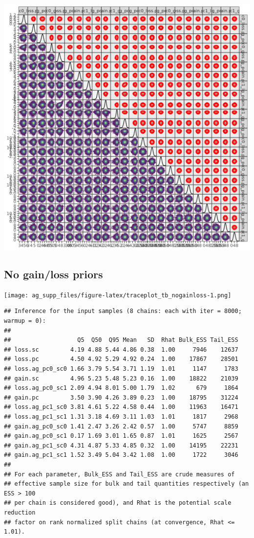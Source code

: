\documentclass[
]{article}
\begin{document}
\includegraphics[width=10.5in]{pix/mcmc_pairs_full}

\hypertarget{no-gainloss-priors}{%
\subsection{No gain/loss priors}\label{no-gainloss-priors}}

\texttt{[image: ag\_supp\_files/figure-latex/traceplot\_tb\_nogainloss-1.png]}

\begin{verbatim}
## Inference for the input samples (8 chains: each with iter = 8000; warmup = 0):
## 
##                   Q5  Q50  Q95 Mean   SD  Rhat Bulk_ESS Tail_ESS
## loss.sc         4.19 4.88 5.44 4.86 0.38  1.00     7946    12637
## loss.pc         4.50 4.92 5.29 4.92 0.24  1.00    17867    28501
## loss.ag_pc0_sc0 1.66 3.79 5.54 3.71 1.19  1.01     1147     1783
## gain.sc         4.96 5.23 5.48 5.23 0.16  1.00    18822    21039
## loss.ag_pc0_sc1 2.09 4.94 8.01 5.00 1.79  1.02      679     1864
## gain.pc         3.50 3.90 4.26 3.89 0.23  1.00    18795    31224
## loss.ag_pc1_sc0 3.81 4.61 5.22 4.58 0.44  1.00    11963    16471
## loss.ag_pc1_sc1 1.31 3.18 4.69 3.11 1.03  1.01     1817     2968
## gain.ag_pc0_sc0 1.41 2.47 3.26 2.42 0.57  1.00     5747     8859
## gain.ag_pc0_sc1 0.17 1.69 3.01 1.65 0.87  1.01     1625     2567
## gain.ag_pc1_sc0 4.31 4.87 5.33 4.85 0.32  1.00    14195    22231
## gain.ag_pc1_sc1 1.52 3.49 5.04 3.42 1.08  1.00     1722     3046
## 
## For each parameter, Bulk_ESS and Tail_ESS are crude measures of 
## effective sample size for bulk and tail quantities respectively (an ESS > 100 
## per chain is considered good), and Rhat is the potential scale reduction 
## factor on rank normalized split chains (at convergence, Rhat <= 1.01).
\end{verbatim}
\end{document}
